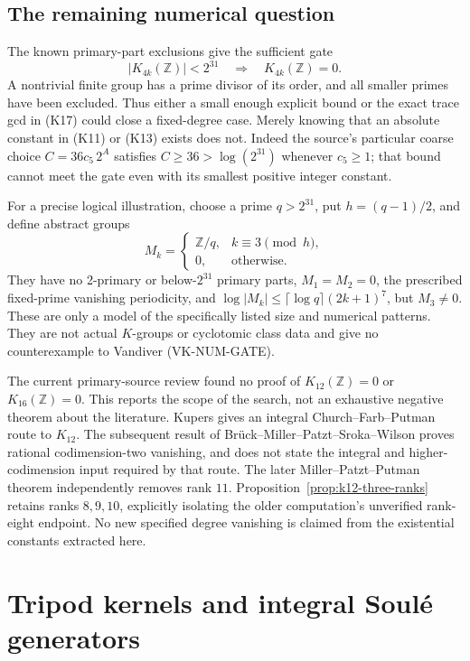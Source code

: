 \documentclass[11pt,a4paper]{article}
\theoremstyle{definition}
\begin{document}
\subsection{The remaining numerical question}

The known primary-part exclusions give the sufficient gate
\[
 |K_{4k}(\mathbb Z)|<2^{31}
 \quad\Longrightarrow\quad K_{4k}(\mathbb Z)=0.       \tag{K22}
\]
A nontrivial finite group has a prime divisor of its order,
and all smaller primes have been excluded. Thus either a
small enough explicit bound or the exact trace gcd in
(K17) could close a fixed-degree case. Merely knowing that
an absolute constant in (K11) or (K13) exists does not.
Indeed the source's particular coarse choice
\(C=36c_5\,2^A\) satisfies \(C\ge36>\log(2^{31})\)
whenever \(c_5\ge1\); that bound cannot meet the gate even
with its smallest positive integer constant.

For a precise logical illustration, choose a prime
\(q>2^{31}\), put \(h=(q-1)/2\), and define abstract groups
\[
 M_k=
 \begin{cases}
 \mathbb Z/q,& k\equiv3\pmod h,\\
 0,&\text{otherwise}.
 \end{cases}
\]
They have no 2-primary or below-\(2^{31}\) primary parts,
\(M_1=M_2=0\), the prescribed fixed-prime vanishing
periodicity, and
\(\log|M_k|\le\lceil\log q\rceil(2k+1)^7\), but
\(M_3\ne0\). These are only a model of the specifically
listed size and numerical patterns. They are not actual
\(K\)-groups or cyclotomic class data and give no
counterexample to Vandiver (VK-NUM-GATE).

The current primary-source review found no proof of
\(K_{12}(\mathbb Z)=0\) or \(K_{16}(\mathbb Z)=0\).
This reports the scope of the search, not an exhaustive
negative theorem about the literature.
Kupers \cite[Remark~2.6, p.~4]{Kupers2019} gives an
integral Church--Farb--Putman route to \(K_{12}\).
The subsequent result of Br\"uck--Miller--Patzt--Sroka--Wilson
\cite[Theorem~B]{BrueckEtAl2024} proves rational
codimension-two vanishing, and does not state the integral
and higher-codimension input required by that route.
The later Miller--Patzt--Putman theorem independently removes rank $11$.
Proposition~\ref{prop:k12-three-ranks} retains ranks $8,9,10$, explicitly
isolating the older computation's unverified rank-eight endpoint.
No new specified degree vanishing is claimed from the
existential constants extracted here.

\section{Tripod kernels and integral Soul\'e generators}
\label{sec:tripod-integral}
\end{document}
